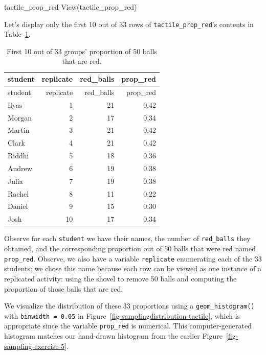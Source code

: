 \documentclass[
  letterpaper,
  DIV=11,
  numbers=noendperiod]{scrreprt}
\newenvironment{Shaded}{\begin{snugshade}}{\end{snugshade}}
\newcommand{\FunctionTok}[1]{\textcolor[rgb]{0.28,0.35,0.67}{#1}}
\newcommand{\NormalTok}[1]{\textcolor[rgb]{0.00,0.23,0.31}{#1}}
\theoremstyle{definition}
\theoremstyle{remark}
\begin{document}
\begin{Shaded}
\begin{Highlighting}[]
\NormalTok{tactile\_prop\_red}
\FunctionTok{View}\NormalTok{(tactile\_prop\_red)}
\end{Highlighting}
\end{Shaded}

Let's display only the first 10 out of 33 rows of
\texttt{tactile\_prop\_red}'s contents in Table~\ref{tbl-tactilered}.

\hypertarget{tbl-tactilered}{}
\begin{longtable}[]{@{}lrrr@{}}
\caption{\label{tbl-tactilered}First 10 out of 33 groups' proportion of
50 balls that are red.}\tabularnewline
\toprule()
student & replicate & red\_balls & prop\_red \\
\midrule()
\endfirsthead
\toprule()
student & replicate & red\_balls & prop\_red \\
\midrule()
\endhead
Ilyas & 1 & 21 & 0.42 \\
Morgan & 2 & 17 & 0.34 \\
Martin & 3 & 21 & 0.42 \\
Clark & 4 & 21 & 0.42 \\
Riddhi & 5 & 18 & 0.36 \\
Andrew & 6 & 19 & 0.38 \\
Julia & 7 & 19 & 0.38 \\
Rachel & 8 & 11 & 0.22 \\
Daniel & 9 & 15 & 0.30 \\
Josh & 10 & 17 & 0.34 \\
\bottomrule()
\end{longtable}

Observe for each \texttt{student} we have their names, the number of
\texttt{red\_balls} they obtained, and the corresponding proportion out
of 50 balls that were red named \texttt{prop\_red}. Observe, we also
have a variable \texttt{replicate} enumerating each of the 33 students;
we chose this name because each row can be viewed as one instance of a
replicated activity: using the shovel to remove 50 balls and computing
the proportion of those balls that are red.

We visualize the distribution of these 33 proportions using a
\texttt{geom\_histogram()} with \texttt{binwidth\ =\ 0.05} in
Figure~\ref{fig-samplingdistribution-tactile}, which is appropriate
since the variable \texttt{prop\_red} is numerical. This
computer-generated histogram matches our hand-drawn histogram from the
earlier Figure~\ref{fig-sampling-exercise-5}.
\end{document}
